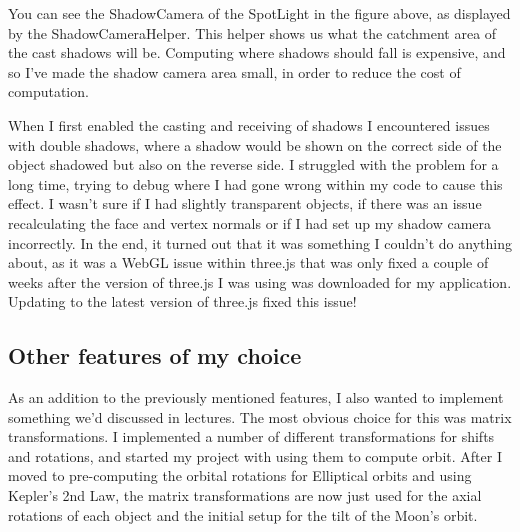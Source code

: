 \documentclass[12pt]{article}
\begin{document}
You can see the ShadowCamera of the SpotLight in the figure above, as displayed by the ShadowCameraHelper. This helper shows us what the catchment area of the cast shadows will be. Computing where shadows should fall is expensive, and so I've made the shadow camera area small, in order to reduce the cost of computation.

When I first enabled the casting and receiving of shadows I encountered issues with double shadows, where a shadow would be shown on the correct side of the object shadowed but also on the reverse side. I struggled with the problem for a long time, trying to debug where I had gone wrong within my code to cause this effect. I wasn't sure if I had slightly transparent objects, if there was an issue recalculating the face and vertex normals or if I had set up my shadow camera incorrectly. In the end, it turned out that it was something I couldn't do anything about, as it was a WebGL issue\cite{shadow1}\cite{shadow2} within three.js that was only fixed a couple of weeks after the version of three.js I was using was downloaded for my application. Updating to the latest version of three.js fixed this issue!

\subsection{Other features of my choice}
As an addition to the previously mentioned features, I also wanted to implement something we'd discussed in lectures. The most obvious choice for this was matrix transformations. I implemented a number of different transformations for shifts and rotations, and started my project with using them to compute orbit. After I moved to pre-computing the orbital rotations for Elliptical orbits and using Kepler's 2nd Law, the matrix transformations are now just used for the axial rotations of each object and the initial setup for the tilt of the Moon's orbit.
\end{document}
